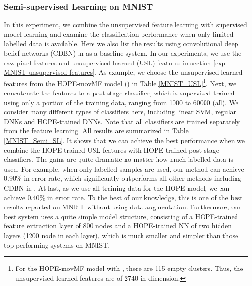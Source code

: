 \documentclass[11pt]{article}
\begin{document}
\subsubsection{Semi-supervised Learning on MNIST}

In this experiment, we combine the unsupervised feature learning with supervised model learning and examine the classification performance when only limited labelled data is available. Here we also list the results using convolutional deep belief networks (CDBN) in \cite{Lee2009CDBN} as a baseline system. In our experiments, we use the raw pixel features and unsupervised learned (USL) features in section \ref{exp-MNIST-unsupervised-features}. As example, we choose the unsupervised learned features from the HOPE-movMF model () in Table \ref{MNIST_USL}\footnote{For the HOPE-movMF model with , there are 115 empty clusters. Thus, the unsupervised learned features are of 2740 in dimension.}.
Next, we concatenate the features to a post-stage classifier, which is supervised trained using only a portion of the training data, ranging from 1000 to 60000 (all). We consider many different types of classifiers here, including linear SVM, regular DNNs and HOPE-trained DNNs. Note that all classifiers are trained separately from the feature learning. 
All results are summarized in  Table \ref{MNIST_Semi_SL}. It shows that we can achieve the best performance when we combine the HOPE-trained USL features with HOPE-trained post-stage classifiers. The gains are quite dramatic no matter how much labelled data is used. For example, when only  labelled samples are used, our method can achieve 0.90\% in error rate, which significantly outperforms all other methods including CDBN in \cite{Lee2009CDBN}. At last, as we use all training data for the HOPE model, we can achieve 0.40\% in error rate. To the best of our knowledge, this is one of the best results reported on MNIST without using data augmentation. Furthermore, our best system uses a quite simple model structure, consisting of a HOPE-trained feature extraction layer of 800 nodes and a HOPE-trained NN of two hidden layers (1200 node in each layer), which is much smaller and simpler than those top-performing systems on MNIST.
\end{document}
